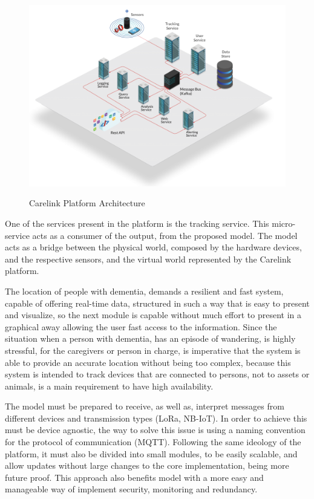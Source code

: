 \begin{figure}[htbp]
  \centering
  
    {\includegraphics[width=1\linewidth]{Chapters/Figures/Carelink-Diagrams-1024x724.png}}%
 
  \caption{Carelink Platform Architecture~\cite{carelink}}
  \label{fig:Platform_Archictecture}
\end{figure}
One of the services present in the platform is the tracking service. This micro-service acts as a consumer of the output, from the proposed model. 
The model acts as a bridge between the physical world, composed by the hardware devices, and the respective sensors, and the virtual world represented by the Carelink platform.

The location of people with dementia, demands a resilient and fast system, capable of offering real-time data, structured in such a way that is easy to present and visualize, so the next module is capable without much effort to present in a graphical away allowing the user fast access to the information.
Since the situation when a person with dementia, has an episode of wandering, is highly stressful, for the caregivers or person in charge, is imperative that the system is able to provide an accurate location without being too complex, because this system is intended to track devices that are connected to persons, not to assets or animals, is a main requirement to have high availability.\newline


The model must be prepared to receive, as well as, interpret messages from different devices and transmission types (LoRa, NB-IoT). In order to achieve this must be device agnostic, the way to solve this issue is using a naming convention for the protocol of communication (MQTT). 
Following the same ideology of the platform, it must also be divided into small modules, to be easily scalable, and allow updates without large changes to the core implementation, being more future proof. This approach also benefits model with a more easy and manageable way of implement security, monitoring and redundancy.

